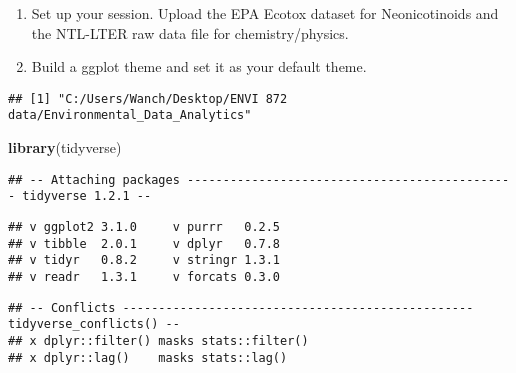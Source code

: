 \documentclass[]{article}
\newenvironment{Shaded}{\begin{snugshade}}{\end{snugshade}}
\newcommand{\KeywordTok}[1]{\textcolor[rgb]{0.13,0.29,0.53}{\textbf{#1}}}
\newcommand{\DataTypeTok}[1]{\textcolor[rgb]{0.13,0.29,0.53}{#1}}
\newcommand{\StringTok}[1]{\textcolor[rgb]{0.31,0.60,0.02}{#1}}
\newcommand{\CommentTok}[1]{\textcolor[rgb]{0.56,0.35,0.01}{\textit{#1}}}
\newcommand{\OperatorTok}[1]{\textcolor[rgb]{0.81,0.36,0.00}{\textbf{#1}}}
\newcommand{\NormalTok}[1]{#1}
\begin{document}
\begin{enumerate}
\def\labelenumi{\arabic{enumi}.}
\item
  Set up your session. Upload the EPA Ecotox dataset for Neonicotinoids
  and the NTL-LTER raw data file for chemistry/physics.
\item
  Build a ggplot theme and set it as your default theme.
\end{enumerate}

\begin{Shaded}
\end{Shaded}

\begin{verbatim}
## [1] "C:/Users/Wanch/Desktop/ENVI 872 data/Environmental_Data_Analytics"
\end{verbatim}

\begin{Shaded}
\begin{Highlighting}[]
\KeywordTok{library}\NormalTok{(tidyverse)}
\end{Highlighting}
\end{Shaded}

\begin{verbatim}
## -- Attaching packages ---------------------------------------------- tidyverse 1.2.1 --
\end{verbatim}

\begin{verbatim}
## v ggplot2 3.1.0     v purrr   0.2.5
## v tibble  2.0.1     v dplyr   0.7.8
## v tidyr   0.8.2     v stringr 1.3.1
## v readr   1.3.1     v forcats 0.3.0
\end{verbatim}

\begin{verbatim}
## -- Conflicts ------------------------------------------------- tidyverse_conflicts() --
## x dplyr::filter() masks stats::filter()
## x dplyr::lag()    masks stats::lag()
\end{verbatim}

\begin{Shaded}
\end{Shaded}
\end{document}
